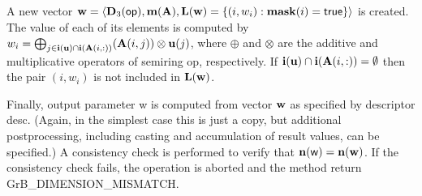A new vector ${\bf w} = \langle \bold{D}_3({\sf op}),
\bold{m}({\bf A}), \bold{L}({\bf w}) = \{(i,w_i) : {\bf mask}(i)
= {\sf true} \} \rangle$ is created.  The value of each of its elements
is computed by $w_i = \bigoplus_{j \in {\bf i}({\bf u}) \cap
{\bf i}({\bf A}(i,:))} ({\bf A}(i,j)) \otimes {\bf u}(j)$,
where $\oplus$ and $\otimes$ are the additive and multiplicative
operators of semiring {\sf op}, respectively.  If ${\bf i}({\bf u})
\cap {\bf i}({\bf A}(i,:)) = \emptyset$ then the pair $(i,w_i)$
is not included in $\bold{L}({\bf w})$.

Finally, output parameter {\sf w} is computed from vector ${\bf w}$
as specified by descriptor {\sf desc}. (Again, in the simplest case this
is just a copy, but additional postprocessing, including casting and
accumulation of result values, can be specified.)  A consistency check is
performed to verify that $\bold{n}({\sf w}) = \bold{n}({\bf w})$. If
the consistency check fails, the operation is aborted and the method
return {\sf GrB\_DIMENSION\_MISMATCH}.

